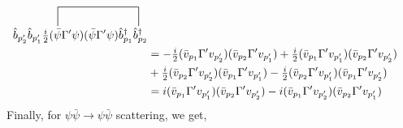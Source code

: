 \documentclass[12pt]{article}
\renewcommand{\b}{\hat{b}}
\newcommand{\bdag}{\hat{b}^\dagger}
\begin{document}
\begin{align*}
\contraction[4ex]{\b_{p_2'} \b_{p_1'} \tfrac{i}{2} ( }{ \bar{\psi} }{ \Gamma' \psi) ( \bar{\psi}  \Gamma' \psi )\bdag_{p_1} }{ \bdag}
\b_{p_2'} \b_{p_1'} \tfrac{i}{2} ( \bar{\psi} \Gamma' \psi) (\bar{\psi} \Gamma' \psi)\bdag_{p_1} \bdag_{p_2}
\\
& = -\tfrac{i}{2} ( \bar{v}_{p_1} \Gamma' v_{p_2'}) (\bar{v}_{p_2} \Gamma' v_{p_1'}) + \tfrac{i}{2} ( \bar{v}_{p_1} \Gamma' v_{p_1'}) (\bar{v}_{p_2} \Gamma' v_{p_2'})
\\
& + \tfrac{i}{2} ( \bar{v}_{p_2} \Gamma' v_{p_2'}) (\bar{v}_{p_1} \Gamma' v_{p_1'}) - \tfrac{i}{2} ( \bar{v}_{p_2} \Gamma' v_{p_1'}) (\bar{v}_{p_1} \Gamma' v_{p_2'})
\\
& = i ( \bar{v}_{p_1} \Gamma' v_{p_1'}) (\bar{v}_{p_2} \Gamma' v_{p_2'}) - i ( \bar{v}_{p_1} \Gamma' v_{p_2'}) (\bar{v}_{p_2} \Gamma' v_{p_1'})
\end{align*}
Finally, for $\psi \bar{\psi} \to \psi \bar{\psi}$ scattering, we get,
\end{document}

